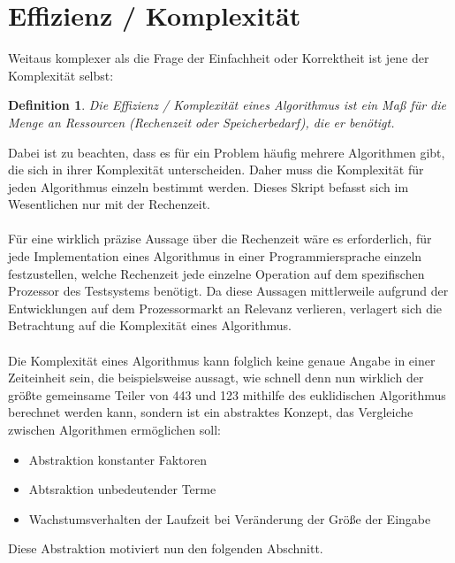 \documentclass[11pt,a4paper]{scrartcl}
\newtheorem{definition}{Definition}
\begin{document}
\section{Effizienz / Komplexität}
Weitaus komplexer als die Frage der Einfachheit oder Korrektheit ist jene der Komplexität selbst:
\begin{definition}
Die Effizienz / Komplexität eines Algorithmus ist ein Maß für die Menge an Ressourcen (Rechenzeit oder Speicherbedarf), die er benötigt.
\end{definition}
Dabei ist zu beachten, dass es für ein Problem häufig mehrere Algorithmen gibt, die sich in ihrer Komplexität unterscheiden. Daher muss die Komplexität für jeden Algorithmus einzeln bestimmt werden. Dieses Skript befasst sich im Wesentlichen nur mit der Rechenzeit. \\\\
Für eine wirklich präzise Aussage über die Rechenzeit wäre es erforderlich, für jede Implementation eines Algorithmus in einer Programmiersprache einzeln festzustellen, welche Rechenzeit jede einzelne Operation auf dem spezifischen Prozessor des Testsystems benötigt. Da diese Aussagen mittlerweile aufgrund der Entwicklungen auf dem Prozessormarkt an Relevanz verlieren, verlagert sich die Betrachtung auf die Komplexität eines Algorithmus. \\\\
Die Komplexität eines Algorithmus kann folglich keine genaue Angabe in einer Zeiteinheit sein, die beispielsweise aussagt, wie schnell denn nun wirklich der größte gemeinsame Teiler von 443 und 123 mithilfe des euklidischen Algorithmus berechnet werden kann, sondern ist ein abstraktes Konzept, das Vergleiche zwischen Algorithmen ermöglichen soll:
\begin{itemize}
\item Abstraktion konstanter Faktoren
\item Abtsraktion unbedeutender Terme
\item Wachstumsverhalten der Laufzeit bei Veränderung der Größe der Eingabe
\end{itemize}
Diese Abstraktion motiviert nun den folgenden Abschnitt.
\end{document}

